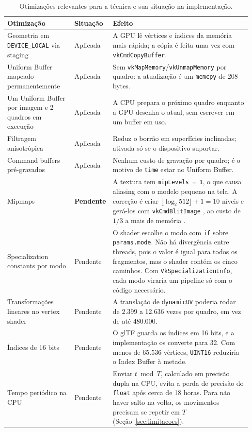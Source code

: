 \begin{table}[H]
\centering
\caption{Otimizações relevantes para a técnica e sua situação na implementação.}
\label{tab:otimizacoes}
\small
\begin{tabular}{p{3.6cm}p{1.6cm}p{8.6cm}}
\toprule
\textbf{Otimização} & \textbf{Situação} & \textbf{Efeito} \\
\midrule
Geometria em \texttt{DEVICE\_LOCAL} via staging & Aplicada & A GPU lê vértices e índices da memória mais rápida; a cópia é feita uma vez com \texttt{vkCmdCopyBuffer}. \\
Uniform Buffer mapeado permanentemente & Aplicada & Sem \texttt{vkMapMemory}/\texttt{vkUnmapMemory} por quadro: a atualização é um \texttt{memcpy} de 208 bytes. \\
Um Uniform Buffer por imagem e 2 quadros em execução & Aplicada & A CPU prepara o próximo quadro enquanto a GPU desenha o atual, sem escrever em um buffer em uso. \\
Filtragem anisotrópica & Aplicada & Reduz o borrão em superfícies inclinadas; ativada só se o dispositivo suportar. \\
Command buffers pré-gravados & Aplicada & Nenhum custo de gravação por quadro; é o motivo de \texttt{time} estar no Uniform Buffer. \\
\addlinespace
Mipmaps & \textbf{Pendente} & A textura tem \texttt{mipLevels = 1}, o que causa aliasing com o modelo pequeno na tela. A correção é criar \(\lfloor\log_2 512\rfloor+1=10\) níveis e gerá-los com \texttt{vkCmdBlitImage} \cite{vkmipmaps}, ao custo de \(1/3\) a mais de memória \cite[p.~9]{heckbert1986}. \\
Specialization constants por modo & Pendente & O shader escolhe o modo com \texttt{if} sobre \texttt{params.mode}. Não há divergência entre threads, pois o valor é igual para todos os fragmentos, mas o shader contém os cinco caminhos. Com \texttt{VkSpecializationInfo}, cada modo viraria um pipeline só com o código necessário. \\
Transformações lineares no vertex shader & Pendente & A translação de \texttt{dynamicUV} poderia rodar de 2.399 a 12.636 vezes por quadro, em vez de até 480.000. \\
Índices de 16 bits & Pendente & O glTF guarda os índices em 16 bits, e a implementação os converte para 32. Com menos de 65.536 vértices, \texttt{UINT16} reduziria o Index Buffer à metade. \\
Tempo periódico na CPU & Pendente & Enviar \(t \bmod T\), calculado em precisão dupla na CPU, evita a perda de precisão do \texttt{float} após cerca de 18 horas. Para não haver salto na volta, os movimentos precisam se repetir em \(T\) (Seção~\ref{sec:limitacoes}). \\
\bottomrule
\end{tabular}
\end{table}

